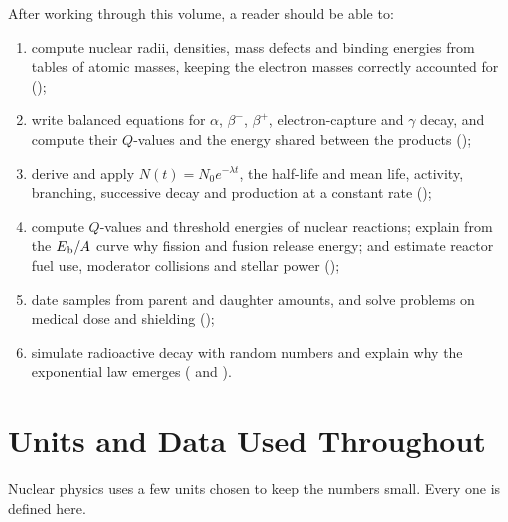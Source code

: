 After working through this volume, a reader should be able to:
\begin{enumerate}[label=\arabic*.]
\item compute nuclear radii, densities, mass defects and binding energies from tables of atomic masses,
keeping the electron masses correctly accounted for ();
\item write balanced equations for $\alpha$, $\beta^-$, $\beta^+$, electron-capture and $\gamma$ decay, and
compute their $Q$-values and the energy shared between the products ();
\item derive and apply $N(t)=N_0e^{-\lambda t}$, the half-life and mean life, activity, branching,
successive decay and production at a constant rate ();
\item compute $Q$-values and threshold energies of nuclear reactions; explain from the $E_{\mathrm{b}}/A$ curve why
fission and fusion release energy; and estimate reactor fuel use, moderator collisions and stellar power
();
\item date samples from parent and daughter amounts, and solve problems on medical dose and shielding
();
\item simulate radioactive decay with random numbers and explain why the exponential law emerges
( and ).
\end{enumerate}

\section*{Units and Data Used Throughout}

Nuclear physics uses a few units chosen to keep the numbers small. Every one is defined here.

